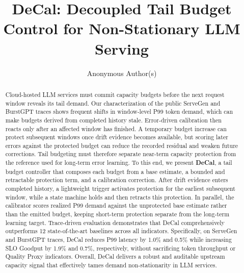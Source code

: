 \documentclass[sigplan,10pt, anonymous]{acmart}
\begin{document}
\pagestyle{plain}

\title{DeCal: Decoupled Tail Budget Control for Non-Stationary LLM Serving}
\author{Anonymous Author(s)}



\begin{abstract}

Cloud-hosted LLM services must commit capacity budgets before the next request window reveals its tail demand. Our characterization of the public ServeGen and BurstGPT traces shows frequent shifts in window-level P99 token demand, which can make budgets derived from completed history stale. Error-driven calibration then reacts only after an affected window has finished. A temporary budget increase can protect subsequent windows once drift evidence becomes available, but scoring later errors against the protected budget can reduce the recorded residual and weaken future corrections. Tail budgeting must therefore separate near-term capacity protection from the reference used for long-term error learning. To this end, we present \textbf{DeCal}, a tail budget controller that composes each budget from a base estimate, a bounded and retractable protection term, and a calibration correction. After drift evidence enters completed history, a lightweight trigger activates protection for the earliest subsequent window, while a state machine holds and then retracts this protection. In parallel, the calibrator scores realized P99 demand against the unprotected base estimate rather than the emitted budget, keeping short-term protection separate from the long-term learning target. Trace-driven evaluation demonstrates that DeCal comprehensively outperforms 12 state-of-the-art baselines across all indicators. Specifically, on ServeGen and BurstGPT traces, DeCal reduces P99 latency by 1.0\% and 0.5\% while increasing SLO Goodput by 1.9\% and 0.7\%, respectively, without sacrificing token throughput or Quality Proxy indicators. Overall, DeCal delivers a robust and auditable upstream capacity signal that effectively tames demand non-stationarity in LLM services.
\end{abstract}
\end{document}
